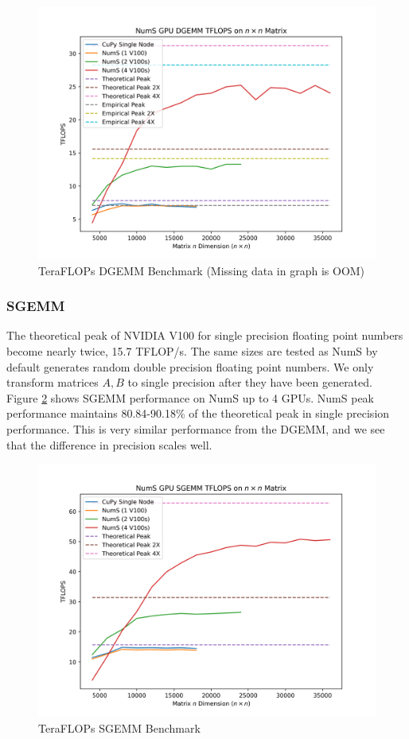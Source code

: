 \documentclass{article}
\begin{document}
\begin{figure}
	\centerline{\includegraphics[width=5in]{figures/NumS_GPU_TFLOPS_DGEMM.png}}
	\caption{TeraFLOPs DGEMM Benchmark (Missing data in graph is OOM)}
	\label{fig:dgemm}
\end{figure}

\subsubsection{SGEMM}
The theoretical peak of NVIDIA V100 for single precision floating point numbers become nearly twice, 15.7 TFLOP/s. The same sizes are tested as NumS by default generates random double precision floating point numbers. We only transform matrices $A, B$ to single precision after they have been generated. Figure \ref{fig:sgemm} shows SGEMM performance on NumS up to 4 GPUs. NumS peak performance maintains 80.84-90.18\% of the theoretical peak in single precision performance. This is very similar performance from the DGEMM, and we see that the difference in precision scales well.

\begin{figure}
	\centerline{\includegraphics[width=5in]{figures/NumS_GPU_TFLOPS_SGEMM.png}}
	\caption{TeraFLOPs SGEMM Benchmark}
	\label{fig:sgemm}
\end{figure}
\end{document}
